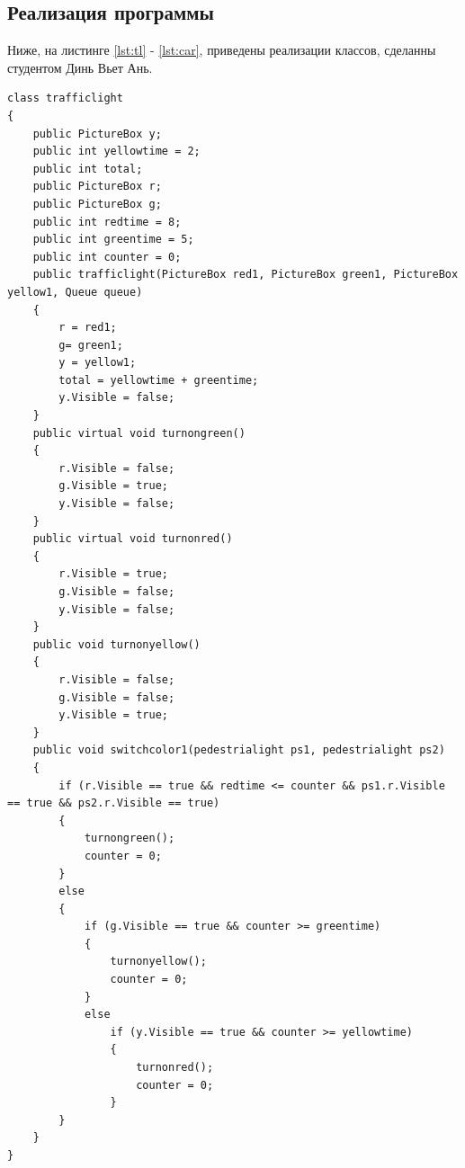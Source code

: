 \subsection{Реализация программы}
Ниже, на листинге \ref{lst:tl} - \ref{lst:car}, приведены реализации классов, сделанны студентом Динь Вьет Ань.
\begin{lstlisting}[caption = Класс trafficlight, label = {lst:tl}]
class trafficlight
{
    public PictureBox y;
    public int yellowtime = 2;
    public int total;
    public PictureBox r;
    public PictureBox g;
    public int redtime = 8;
    public int greentime = 5;
    public int counter = 0;
    public trafficlight(PictureBox red1, PictureBox green1, PictureBox yellow1, Queue queue)
    {
        r = red1;
        g= green1;
        y = yellow1;
        total = yellowtime + greentime;
        y.Visible = false;
    }
    public virtual void turnongreen()
    {
        r.Visible = false;
        g.Visible = true;
        y.Visible = false;
    }
    public virtual void turnonred()
    {
        r.Visible = true;
        g.Visible = false;
        y.Visible = false;
    }
    public void turnonyellow()
    {
        r.Visible = false;
        g.Visible = false;
        y.Visible = true;
    }
    public void switchcolor1(pedestrialight ps1, pedestrialight ps2)
    {
        if (r.Visible == true && redtime <= counter && ps1.r.Visible == true && ps2.r.Visible == true)
        {
            turnongreen();
            counter = 0;
        }
        else
        {
            if (g.Visible == true && counter >= greentime)
            {
                turnonyellow();                   
                counter = 0;
            }
            else
                if (y.Visible == true && counter >= yellowtime)
                {
                    turnonred();                     
                    counter = 0;
                }
        }
    }
}
\end{lstlisting}

